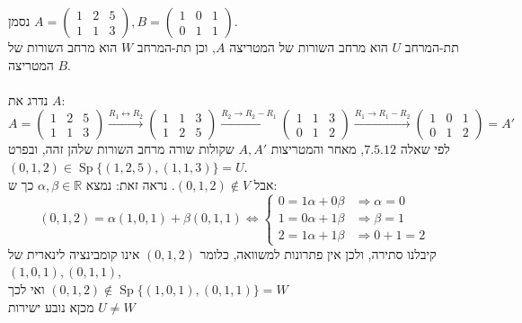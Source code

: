 \documentclass{article}
\DeclareMathOperator\Sp{Sp}
\begin{document}
נסמן $A=\begin{pmatrix}
        1 & 2 & 5 \\
        1 & 1 & 3
    \end{pmatrix}, B = \begin{pmatrix}
        1 & 0 & 1 \\
        0 & 1 & 1
    \end{pmatrix}$. \\
תת-המרחב $U$ הוא מרחב השורות של המטריצה $A$,
וכן תת-המרחב $W$ הוא מרחב השורות של המטריצה $B$. \\
\\
נדרג את $A$:
\[
    A=\begin{pmatrix}
        1 & 2 & 5 \\
        1 & 1 & 3
    \end{pmatrix} \xrightarrow{R_1\leftrightarrow R_2}
    \begin{pmatrix}
        1 & 1 & 3 \\
        1 & 2 & 5
    \end{pmatrix} \xrightarrow{R_2\rightarrow R_2-R_1}
    \begin{pmatrix}
        1 & 1 & 3 \\
        0 & 1 & 2
    \end{pmatrix} \xrightarrow{R_1\rightarrow R_1-R_2}
    \begin{pmatrix}
        1 & 0 & 1 \\
        0 & 1 & 2
    \end{pmatrix}=A'
\]
לפי שאלה $7.5.12$, מאחר והמטריצות $A, A'$ שקולות שורה מרחב השורות שלהן זהה,
ובפרט $(0,1,2)\in \Sp\{(1,2,5), (1,1,3)\}=U$.\\
אבל $(0,1,2)\notin V$. נראה זאת: נמצא $\alpha, \beta \in \mathbb{R}$ כך ש:
\[
    (0,1,2)=\alpha(1,0,1)+\beta(0,1,1)\Leftrightarrow
    \begin{cases}
        0 = 1\alpha + 0\beta & \Rightarrow \alpha =0 \\
        1 = 0\alpha + 1\beta & \Rightarrow\beta =1   \\
        2 = 1\alpha + 1\beta & \Rightarrow 0 + 1 = 2
    \end{cases}
\]
קיבלנו סתירה, ולכן אין פתרונות למשוואה, כלומר $(0,1,2)$
אינו קומבינציה לינארית של $(1,0,1), (0,1,1)$,\\ ואי לכך $(0,1,2)\notin \Sp\{(1,0,1), (0,1,1)\} = W$\\
מכןא נובע ישירות $U\ne W$
\end{document}

